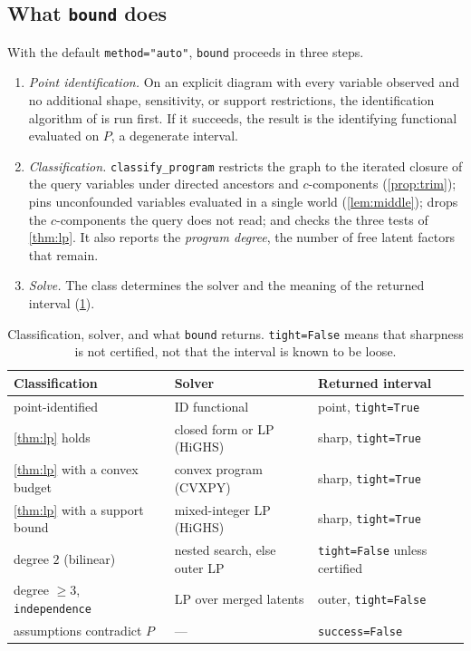 \subsection{What \texttt{bound} does}
\label{sec:solve}

With the default \texttt{method="auto"}, \texttt{bound} proceeds in three
steps.
\begin{enumerate}[leftmargin=1.4em,itemsep=0.2em]
\item \emph{Point identification.} On an explicit diagram with every
variable observed and no additional shape, sensitivity, or support restrictions, the identification algorithm of
\citet{shpitser2006identification} is run first. If it succeeds, the result
is the identifying functional evaluated on $P$, a degenerate interval.
\item \emph{Classification.} \texttt{classify\_program} restricts the graph
to the iterated closure of the query variables under directed ancestors and
$c$-components (\cref{prop:trim}); pins unconfounded variables
evaluated in a single world (\cref{lem:middle}); drops the $c$-components
the query does not read; and checks the three tests of \cref{thm:lp}.
It also reports the \emph{program degree}, the number of free latent
factors that remain.
\item \emph{Solve.} The class determines the solver and the meaning of the
returned interval (\cref{tab:result}).
\end{enumerate}

\begin{table}[ht]
\centering
\caption{Classification, solver, and what \texttt{bound} returns.
\texttt{tight=False} means that sharpness is not certified, not that the
interval is known to be loose.}
\label{tab:result}
\small
\begin{tabular}{@{}lll@{}}
\toprule
Classification & Solver & Returned interval \\
\midrule
point-identified & ID functional & point, \texttt{tight=True} \\
\cref{thm:lp} holds & closed form or LP (HiGHS) & sharp, \texttt{tight=True} \\
\cref{thm:lp} with a convex budget & convex program (CVXPY) & sharp, \texttt{tight=True} \\
\cref{thm:lp} with a support bound & mixed-integer LP (HiGHS) & sharp, \texttt{tight=True} \\
degree $2$ (bilinear) & nested search, else outer LP & \texttt{tight=False} unless certified \\
degree $\ge3$, \texttt{independence} & LP over merged latents & outer, \texttt{tight=False} \\
assumptions contradict $P$ & --- & \texttt{success=False} \\
\bottomrule
\end{tabular}
\end{table}

